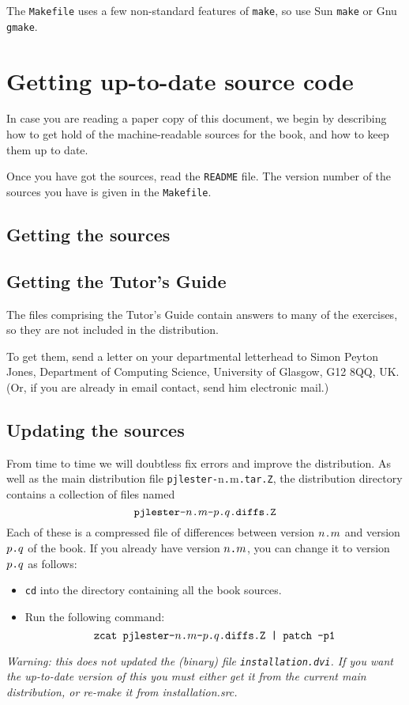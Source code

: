 The \mbox{\tt Makefile} uses a few non-standard features of \mbox{\tt make}, so use Sun \mbox{\tt make} or
Gnu \mbox{\tt gmake}.

\chapter{Getting up-to-date source code}

In case you are reading a paper copy of this document, we begin by
describing how to get hold of the machine-readable sources for the book,
and how to keep them up to date.

Once you have got the sources, read the \mbox{\tt README} file.  The version number
of the sources you have is given in the \mbox{\tt Makefile}.

\section{Getting the sources}


\section{Getting the Tutor's Guide}

The files comprising the Tutor's Guide 
contain answers to many of the exercises, so they are not included in
the distribution.

To get them, send a letter on your departmental
letterhead to Simon Peyton Jones, Department of Computing Science,
University of Glasgow, G12 8QQ, UK.  (Or, if you are already in email contact,
send him electronic mail.)

\section{Updating the sources}

From time to time we will doubtless fix errors and improve the distribution.
As well as the main distribution file \mbox{\tt pjlester-}n\mbox{\tt .}m\mbox{\tt .tar.Z}, the
distribution directory contains a collection of files named
$$
\mbox{\tt pjlester-}n\mbox{\tt .}m\mbox{\tt -}p\mbox{\tt .}q\mbox{\tt .diffs.Z}
$$
Each of these is a compressed file of differences between version $n\mbox{\tt .}m$ and
version $p\mbox{\tt .}q$ of the book.  If you already have version $n\mbox{\tt .}m$, you can
change it to version $p\mbox{\tt .}q$ as follows:
\begin{itemize}
\item
\mbox{\tt cd} into the directory containing all the book sources.
\item
Run the following command:
$$
\mbox{\tt zcat\ pjlester-}n\mbox{\tt .}m\mbox{\tt -}p\mbox{\tt .}q\mbox{\tt .diffs.Z\ |\ patch\ -p1}
$$
\end{itemize}
{\em Warning: this does not updated the (binary) file \mbox{\tt installation.dvi}.
If you want the up-to-date version of this you must either get it
from the current main distribution, or re-make it from installation.src.}

